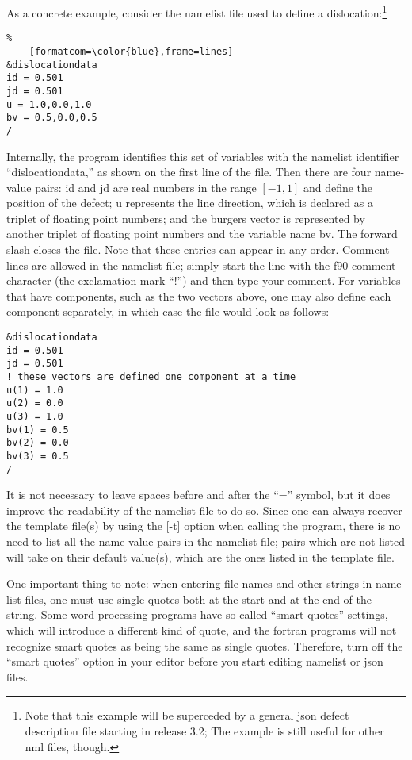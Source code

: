 \documentclass[DIV=calc, paper=letter, fontsize=11pt]{scrartcl}	 %
\begin{document}
As a concrete example, consider the namelist file used to define a dislocation:\footnote{Note that this example will be superceded 
by a general json defect description file starting in release 3.2;  The example is still useful for other nml files, though.}
\begin{Verbatim}%
	[formatcom=\color{blue},frame=lines]
&dislocationdata
id = 0.501
jd = 0.501
u = 1.0,0.0,1.0
bv = 0.5,0.0,0.5
/
\end{Verbatim}
Internally, the program identifies this set of variables with the namelist identifier ``dislocationdata,'' as shown on the first line of the file.
Then there are four name-value pairs: \textsf{id} and \textsf{jd} are real numbers in the range $[-1,1]$ and define the position
of the defect; \textsf{u} represents the line direction, which is declared as a triplet of 
floating point numbers; and the burgers vector is represented by another triplet of floating point numbers and the variable name \textsf{bv}.
The forward slash closes the file.  Note that these entries can appear in any order. Comment lines are allowed in the namelist
file; simply start the line with the f90 comment character (the exclamation mark ``!'') and then type your comment.  For variables that 
have components, such as the two vectors above, one may also define each component separately, in which case the file would look
as follows:
\begin{verbatim}
&dislocationdata
id = 0.501
jd = 0.501
! these vectors are defined one component at a time
u(1) = 1.0 
u(2) = 0.0 
u(3) = 1.0
bv(1) = 0.5
bv(2) = 0.0
bv(3) = 0.5
/
\end{verbatim}
It is not necessary to leave spaces before and after the ``='' symbol, but it does improve the readability of the namelist file to do so. Since 
one can always recover the template file(s) by using the [-t] option when calling the program, there is no need to list all the name-value pairs
in the namelist file; pairs which are not listed will take on their default value(s), which are the ones listed in the template file.

One important thing to note: when entering file names and other strings in name list files, one must use single quotes both at the start and at 
the end of the string.  Some word processing programs have so-called ``smart quotes'' settings, which will introduce a different kind of quote,
and the fortran programs will not recognize smart quotes as being the same as single quotes.  Therefore, turn off the ``smart quotes'' option
in your editor before you start editing namelist or json files.
\end{document}
